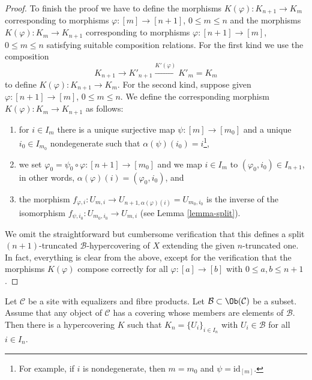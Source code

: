 \begin{proof}
\medskip\noindent
To finish the proof we have to define the morphisms
$K(\varphi) : K_{n + 1} \to K_m$ corresponding to morphisms
$\varphi : [m] \to [n + 1]$, $0 \leq m \leq n$ and the morphisms
$K(\varphi) : K_m \to K_{n + 1}$ corresponding to morphisms
$\varphi : [n + 1] \to [m]$, $0 \leq m \leq n$
satisfying suitable composition relations.
For the first kind we use the composition
$$
K_{n + 1} \to K'_{n + 1} \xrightarrow{K'(\varphi)} K'_m = K_m
$$
to define $K(\varphi) : K_{n + 1} \to K_m$.
For the second kind, suppose given $\varphi : [n + 1] \to [m]$,
$0 \leq m \leq n$. We define the corresponding morphism
$K(\varphi) : K_m \to K_{n + 1}$ as follows:
\begin{enumerate}
\item for $i \in I_m$ there is a unique surjective map
$\psi : [m] \to [m_0]$ and a unique $i_0 \in I_{m_0}$ nondegenerate
such that $\alpha(\psi)(i_0) = i$\footnote{For example, if $i$ is
nondegenerate, then $m = m_0$ and $\psi = \text{id}_{[m]}$.},
\item we set $\varphi_0 = \psi_0 \circ \varphi : [n + 1] \to [m_0]$
and we map
$i \in I_m$ to $(\varphi_0, i_0) \in I_{n + 1}$, in other words,
$\alpha(\varphi)(i) = (\varphi_0, i_0)$, and
\item the morphism
$f_{\varphi, i} : U_{m, i} \to U_{n + 1, \alpha(\varphi)(i)} = U_{m_0, i_0}$
is the inverse of the isomorphism $f_{\psi, i_0} : U_{m_0, i_0} \to U_{m, i}$
(see Lemma \ref{lemma-split}).
\end{enumerate}
We omit the straightforward but cumbersome verification that this defines
a split $(n + 1)$-truncated $\mathcal{B}$-hypercovering of $X$
extending the given $n$-truncated one. In fact, everything is clear
from the above, except for the verification that the morphisms
$K(\varphi)$ compose correctly for all $\varphi : [a] \to [b]$
with $0 \leq a, b \leq n + 1$.
\end{proof}

\begin{lemma}
\label{lemma-hypercovering-site}
Let $\mathcal{C}$ be a site with equalizers and fibre products.
Let $\mathcal{B} \subset \Ob(\mathcal{C})$ be a subset. Assume
that any object of $\mathcal{C}$ has a covering
whose members are elements of $\mathcal{B}$.
Then there is a hypercovering $K$ such that
$K_n = \{U_i\}_{i \in I_n}$ with $U_i \in \mathcal{B}$
for all $i \in I_n$.
\end{lemma}

